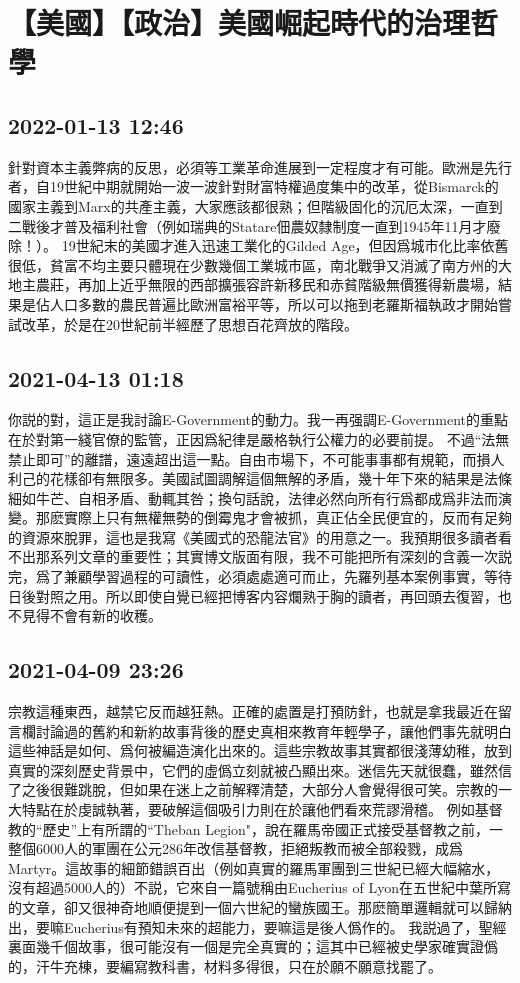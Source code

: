 \documentclass[twocolumn]{ctexart}
\begin{document}
\section*{【美國】【政治】美國崛起時代的治理哲學}
\subsection*{2022-01-13 12:46}

針對資本主義弊病的反思，必須等工業革命進展到一定程度才有可能。歐洲是先行者，自19世紀中期就開始一波一波針對財富特權過度集中的改革，從Bismarck的國家主義到Marx的共產主義，大家應該都很熟；但階級固化的沉厄太深，一直到二戰後才普及福利社會（例如瑞典的Statare佃農奴隸制度一直到1945年11月才廢除！）。
19世紀末的美國才進入迅速工業化的Gilded Age，但因爲城市化比率依舊很低，貧富不均主要只體現在少數幾個工業城市區，南北戰爭又消滅了南方州的大地主農莊，再加上近乎無限的西部擴張容許新移民和赤貧階級無價獲得新農場，結果是佔人口多數的農民普遍比歐洲富裕平等，所以可以拖到老羅斯福執政才開始嘗試改革，於是在20世紀前半經歷了思想百花齊放的階段。
\subsection*{2021-04-13 01:18}

你説的對，這正是我討論E-Government的動力。我一再强調E-Government的重點在於對第一綫官僚的監管，正因爲紀律是嚴格執行公權力的必要前提。
不過“法無禁止即可”的離譜，遠遠超出這一點。自由市場下，不可能事事都有規範，而損人利己的花樣卻有無限多。美國試圖調解這個無解的矛盾，幾十年下來的結果是法條細如牛芒、自相矛盾、動輒其咎；換句話說，法律必然向所有行爲都成爲非法而演變。那麽實際上只有無權無勢的倒霉鬼才會被抓，真正佔全民便宜的，反而有足夠的資源來脫罪，這也是我寫《美國式的恐龍法官》的用意之一。我預期很多讀者看不出那系列文章的重要性；其實博文版面有限，我不可能把所有深刻的含義一次説完，爲了兼顧學習過程的可讀性，必須處處適可而止，先羅列基本案例事實，等待日後對照之用。所以即使自覺已經把博客内容爛熟于胸的讀者，再回頭去復習，也不見得不會有新的收穫。
\subsection*{2021-04-09 23:26}

宗教這種東西，越禁它反而越狂熱。正確的處置是打預防針，也就是拿我最近在留言欄討論過的舊約和新約故事背後的歷史真相來教育年輕學子，讓他們事先就明白這些神話是如何、爲何被編造演化出來的。這些宗教故事其實都很淺薄幼稚，放到真實的深刻歷史背景中，它們的虛僞立刻就被凸顯出來。迷信先天就很蠢，雖然信了之後很難跳脫，但如果在迷上之前解釋清楚，大部分人會覺得很可笑。宗教的一大特點在於虔誠執著，要破解這個吸引力則在於讓他們看來荒謬滑稽。
例如基督教的“歷史”上有所謂的“Theban Legion"，說在羅馬帝國正式接受基督教之前，一整個6000人的軍團在公元286年改信基督教，拒絕叛教而被全部殺戮，成爲Martyr。這故事的細節錯誤百出（例如真實的羅馬軍團到三世紀已經大幅縮水，沒有超過5000人的）不説，它來自一篇號稱由Eucherius of Lyon在五世紀中葉所寫的文章，卻又很神奇地順便提到一個六世紀的蠻族國王。那麽簡單邏輯就可以歸納出，要嘛Eucherius有預知未來的超能力，要嘛這是後人僞作的。
我説過了，聖經裏面幾千個故事，很可能沒有一個是完全真實的；這其中已經被史學家確實證僞的，汗牛充棟，要編寫教科書，材料多得很，只在於願不願意找罷了。
\end{document}
